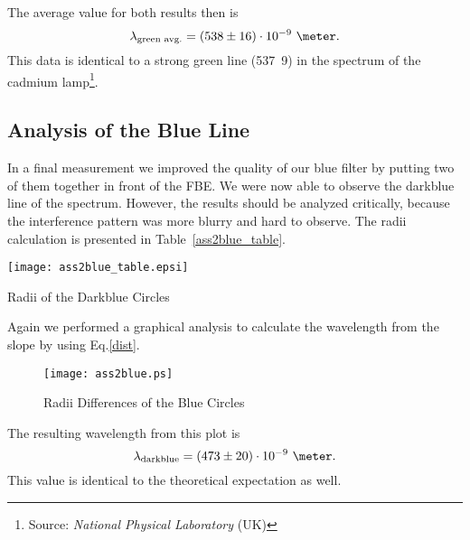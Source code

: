 \documentclass[a4paper,10pt]{article}
\begin{document}
The average value for both results then is
\begin{equation*}
\lambda_\text{green avg.} = (538 \pm 16) \cdot 10^{-9} \text{ \meter}.
\end{equation*}
This data is identical to a strong green line (\unit{537.9}{\nano\meter}) in the spectrum of the cadmium lamp\footnote{Source: \emph{National Physical Laboratory} (UK)}.

\clearpage
\subsection{Analysis of the Blue Line}
In a final measurement we improved the quality of our blue filter by putting two of them together in front of the FBE. We were now able to observe the darkblue line of the spectrum. However, the results should be analyzed critically, because the interference pattern was more blurry and hard to observe. The radii calculation is presented in Table~\ref{ass2blue_table}.
\begin{table}[h]
    \centering
    \texttt{[image: ass2blue\_table.epsi]}
    \caption{Radii of the Darkblue Circles}
    \label{ass2blue_table}
\end{table}

Again we performed a graphical analysis to calculate the wavelength from the slope by using Eq.\ref{dist}.
\begin{figure}[h]
    \centering
    \texttt{[image: ass2blue.ps]}
    \caption{Radii Differences of the Blue Circles}
    \label{ass2blue}
\end{figure}

The resulting wavelength from this plot is
\begin{equation*}
\lambda_\text{darkblue} =  (473 \pm 20) \cdot 10^{-9} \text{ \meter}.
\end{equation*}
This value is identical to the theoretical expectation as well.
\end{document}
